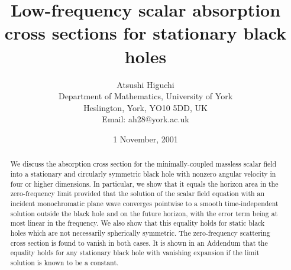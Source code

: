 \documentclass[a4paper,12pt]{article}
\begin{document}
\title{Low-frequency
scalar absorption cross sections for stationary black holes}

\author{Atsushi Higuchi\\
{\normalsize Department of Mathematics, University of York}\\ 
{\normalsize Heslington, York, YO10 5DD, UK}\\
{\normalsize Email: ah28@york.ac.uk}}

\date{1 November, 2001}

\maketitle

\begin{abstract}
We discuss the absorption cross section for the minimally-coupled
massless scalar field into a stationary and circularly symmetric black hole 
with nonzero angular velocity
in four or higher dimensions.  In particular, we show that it
equals the horizon area
in the zero-frequency limit provided that 
the solution of the scalar field equation
with an incident monochromatic plane wave converges pointwise
to a smooth time-independent solution
outside the black hole and on the future horizon,
with the error term being at most linear in the frequency.
We also show that
this equality holds for static black holes which are not necessarily 
spherically symmetric. 
The zero-frequency scattering cross section is found to vanish in both cases.
It is shown in an Addendum that the equality holds for any stationary black
hole with vanishing expansion if the limit solution is known to be a constant.
\end{abstract}
\end{document}
